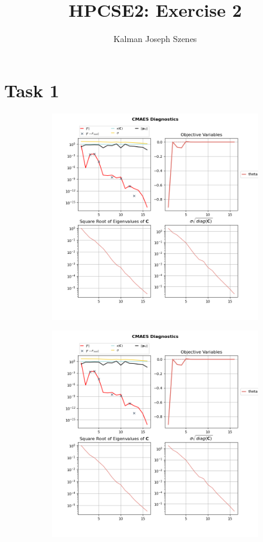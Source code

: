 \documentclass{article}
\author{Kalman Joseph Szenes}
\title{HPCSE2: Exercise 2}
\begin{document}
    \maketitle

    \section{Task 1}

    \begin{figure}[ht]
        \begin{subfigure}[b]{0.5\linewidth}
            \centering
            \includegraphics[width=0.95\linewidth]{img/example_1.png}
        \end{subfigure}
        \begin{subfigure}[b]{0.5\linewidth}
            \centering
            \includegraphics[width=0.95\linewidth]{img/example_1.png}

\end{subfigure}
\end{figure}
\end{document}
